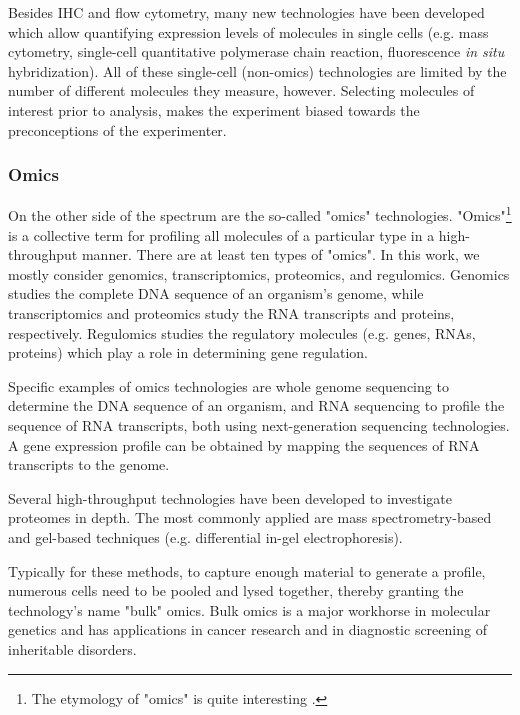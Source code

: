 Besides IHC and flow cytometry, many new technologies have been developed which allow quantifying expression levels of molecules in single cells (e.g. mass cytometry, single-cell quantitative polymerase chain reaction, fluorescence \emph{in situ} hybridization). All of these single-cell (non-omics) technologies are limited by the number of different molecules they measure, however. Selecting molecules of interest prior to analysis, makes the experiment biased towards the preconceptions of the experimenter.

\subsubsection{Omics}
On the other side of the spectrum are the so-called "omics" technologies. "Omics"\footnote{The etymology of "omics" is quite interesting \cite{yadav_wholenesssuffixomics_2007}.} is a collective term for profiling all molecules of a particular type in a high-throughput manner.
There are at least ten types of "omics". In this work, we mostly consider genomics, transcriptomics, proteomics, and regulomics. Genomics studies the complete DNA sequence of an organism's genome, while transcriptomics and proteomics study the RNA transcripts and proteins, respectively. Regulomics studies the regulatory molecules (e.g. genes, RNAs, proteins) which play a role in determining gene regulation.

Specific examples of omics technologies are whole genome sequencing to determine the DNA sequence of an organism, and RNA sequencing to profile the sequence of RNA transcripts, both using next-generation sequencing technologies. A gene expression profile can be obtained by mapping the sequences of RNA transcripts to the genome.

Several high-throughput technologies have been developed to investigate proteomes in depth. The most commonly applied are mass spectrometry-based and gel-based techniques (e.g. differential in-gel electrophoresis).


Typically for these methods, to capture enough material to generate a profile, numerous cells need to be pooled and lysed together, thereby granting the technology's name "bulk" omics.
Bulk omics is a major workhorse in molecular genetics and has applications in cancer research and in diagnostic screening of inheritable disorders.

